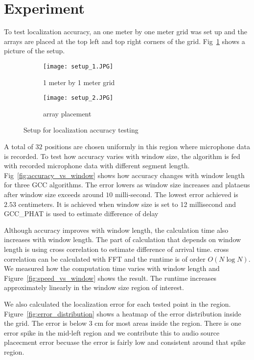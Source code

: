 \section{Experiment}
To test localization accuracy, an one meter by one meter grid was set up and the arrays are placed at the top left and top right corners of the grid. Fig~\ref{fig:setup_point} shows a picture of the setup. 

\begin{figure}[]
  \centering
  \begin{subfigure}[]{.2\textwidth}
    \texttt{[image: setup\_1.JPG]}
    \caption{1 meter by 1 meter grid}
  \end{subfigure}
  \begin{subfigure}[]{.2\textwidth}
    \texttt{[image: setup\_2.JPG]}
    \caption{array placement}
  \end{subfigure}
  \caption{Setup for localization accuracy testing}
  \label{fig:setup_point}
\end{figure}

A total of $32$ positions are chosen uniformly in this region where microphone data is recorded. To test how accuracy varies with window size, the algorithm is fed with recorded microphone data with different segment length. Fig~\ref{fig:accuracy_vs_window} shows how accuracy changes with window length for three GCC algorithms. The error lowers as window size increases and plataeus after window size exceeds around $10$ milli-second. The lowest error achieved is $2.53$ centimeters. It is achieved when window size is set to 12 millisecond and GCC\_PHAT is used to estimate difference of delay

Although accuracy improves with window length, the calculation time also increases with window length. The part of calculation that depends on window length is using cross correlation to estimate difference of arrival time. cross correlation can be calculated with FFT and the runtime is of order $O(N\log N)$. We measured how the computation time varies with window length and Figure~\ref{fig:speed_vs_window} shows the result. The runtime increases approximately linearly in the window size region of interest.

We also calculated the localization error for each tested point in the region. Figure~\ref{fig:error_distribution} shows a heatmap of the error distribution inside the grid. The error is below $3$ cm for most areas inside the region. There is one error spike in the mid-left region and we contribute this to audio source placecment error becuase the error is fairly low and consistent around that spike region.

